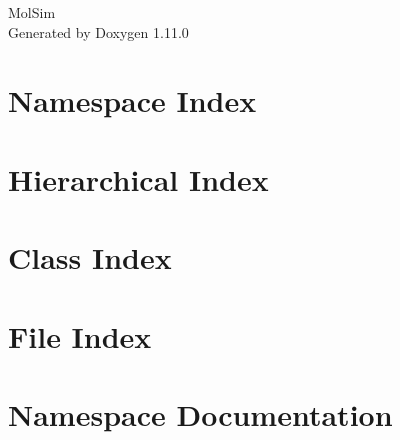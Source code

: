 \documentclass[twoside]{book}
\newcommand{\+}{\discretionary{\mbox{\scriptsize$\hookleftarrow$}}{}{}}
\newcommand{\clearemptydoublepage}{%
    \newpage{\pagestyle{empty}\cleardoublepage}%
  }
\begin{document}
  \raggedbottom
    \hypersetup{pageanchor=false,
                bookmarksnumbered=true,
                pdfencoding=unicode
               }
  \begin{titlepage}
  \vspace*{7cm}
  \begin{center}%
  {\Large Mol\+Sim}\\
  \vspace*{1cm}
  {\large Generated by Doxygen 1.11.0}\\
  \end{center}
  \end{titlepage}
  \clearemptydoublepage
  \tableofcontents
  \clearemptydoublepage
  \hypersetup{pageanchor=true}

\chapter{Namespace Index}

\chapter{Hierarchical Index}

\chapter{Class Index}

\chapter{File Index}

\chapter{Namespace Documentation}





\end{document}
